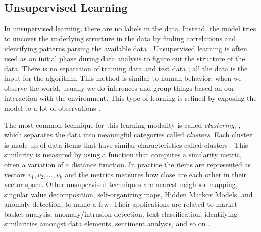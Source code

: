 \documentclass[12pt]{report}
\begin{document}
	\subsection{Unsupervised Learning}
	In unsupervised learning, there are no labels in the data. Instead, the model tries to uncover the underlying structure in the data by 
	finding correlations and identifying patterns parsing the available data \cite{Nevala2017}. Unsupervised learning is often used as 
	an initial phase during data analysis to figure out the structure of the data. 
	There is no separation of training data and test data \cite{Shai2014}; all the data is the input for the algorithm. This method is similar to human behavior: when we observe the world, usually we do inferences and group things based on our interaction with the environment.
	This type of learning is refined by exposing the model to  a lot of observations \cite{Nevala2017}.
	
	The most common technique for this learning modality is called {\em clustering}, \cite{Russell2010}, which separates the data into meaningful categories called {\em clusters}. Each cluster is made up of data items that have similar characteristics called clusters \cite{Nilsson1998} \cite{Goodfellow2016}. This similarity is measured by using a function that computes a similarity metric, often a variation of a distance function. In practice the items are represented as vectors 
	$v_1,  v_2, ..., v_k$ and the metrics measures how close are each other in their vector space. Other unsupervised techniques are nearest neighbor mapping, singular value decomposition,  self-organizing maps, Hidden Markov Models, and anomaly detection, to name a few. Their applications are related to market basket analysis, anomaly/intrusion detection, text classification, identifying similarities amongst data elements, sentiment analysis, and so on \cite{Nevala2017} \cite{Halibas2018}.
	
\end{document}
